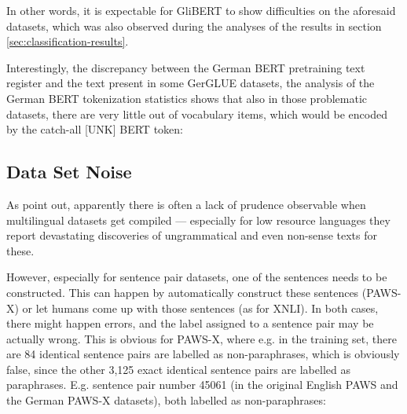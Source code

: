 In other words, it is expectable for GliBERT to show difficulties on the aforesaid datasets, which
was also observed during the analyses of the results in section \ref{sec:classification-results}.

Interestingly, the discrepancy between the German BERT pretraining text register and the text
present in some GerGLUE datasets, the analysis of the German BERT tokenization statistics shows
that also in those problematic datasets, there are very little out of vocabulary items, which
would be encoded by the catch-all [UNK] BERT token:




\subsection{Data Set Noise}
\label{sec:label-noise}

As \citep{caswell2021quality} point out, apparently there is often a lack of
prudence observable when multilingual datasets get compiled --- especially for
low resource languages they report devastating discoveries of ungrammatical
and even non-sense texts for these.


However, especially for sentence pair datasets, one of the sentences needs to be constructed. This
can happen by automatically construct these sentences (PAWS-X) or let humans come up with those
sentences (as for XNLI). In both cases, there might happen errors, and the label assigned to a
sentence pair may be actually wrong. This is obvious for PAWS-X, where e.g. in the training set,
there are 84 identical sentence pairs are labelled as non-paraphrases, which is obviously false,
since the other 3,125 exact identical sentence pairs are labelled as paraphrases. E.g. sentence pair
number 45061 (in the original English PAWS and the German PAWS-X datasets), both labelled as
non-paraphrases:

